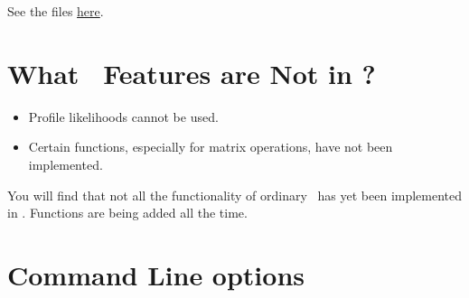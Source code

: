 \documentclass{admbmanual}
\begin{document}
See the files \href{http://admb-project.org/community/tutorials-and-examples/%
random-effects-example-collection/%
item-response-theory-irt-and-the-multilevel-rasch-model-1}{here}.

\chapter{What \scAB\ Features are Not in \scAR?}

\begin{itemize}
\item Profile likelihoods cannot be used.
\item Certain functions, especially for matrix operations, have not been
implemented.
\end{itemize}

You will find that not all the functionality of ordinary \scAB\ has yet been
implemented in \scAR. Functions are being added all the time.

\chapter{Command Line options}
\label{sec:command_line_options}
\end{document}
